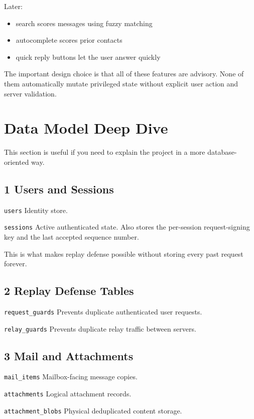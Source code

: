 \documentclass[11pt,a4paper]{article}
\begin{document}
Later:

\begin{itemize}
\item search scores messages using fuzzy matching
\item autocomplete scores prior contacts
\item quick reply buttons let the user answer quickly
\end{itemize}

The important design choice is that all of these features are advisory. None of them automatically mutate privileged state without explicit user action and server validation.


\section{Data Model Deep Dive}

This section is useful if you need to explain the project in a more database- oriented way.

\subsection{1 Users and Sessions}

\nolinkurl{users} Identity store.

\nolinkurl{sessions} Active authenticated state. Also stores the per-session request-signing key and the last accepted sequence number.

This is what makes replay defense possible without storing every past request forever.

\subsection{2 Replay Defense Tables}

\nolinkurl{request_guards} Prevents duplicate authenticated user requests.

\nolinkurl{relay_guards} Prevents duplicate relay traffic between servers.

\subsection{3 Mail and Attachments}

\nolinkurl{mail_items} Mailbox-facing message copies.

\nolinkurl{attachments} Logical attachment records.

\nolinkurl{attachment_blobs} Physical deduplicated content storage.
\end{document}
